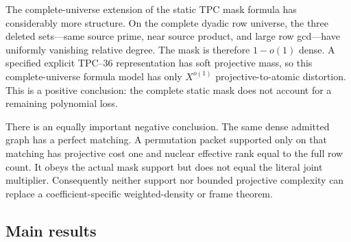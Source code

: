 The complete-universe extension of the static TPC mask formula has
considerably more structure.  On the complete dyadic row universe, the
three deleted
sets---same source prime, near source product, and large row gcd---have
uniformly vanishing relative degree.  The mask is therefore
\(1-o(1)\) dense.  A specified explicit TPC--36 representation has soft
projective mass, so this complete-universe formula model has only
\(X^{o(1)}\)
projective-to-atomic distortion.  This is a positive conclusion: the
complete static mask does not account for a remaining polynomial loss.

There is an equally important negative conclusion.  The same dense
admitted graph has a perfect matching.  A permutation packet supported
only on that matching has projective cost one and nuclear effective
rank equal to the full row count.  It obeys the actual mask support but
does not equal the literal joint multiplier.  Consequently neither
support nor bounded projective complexity can replace a
coefficient-specific weighted-density or frame theorem.

\subsection{Main results}

